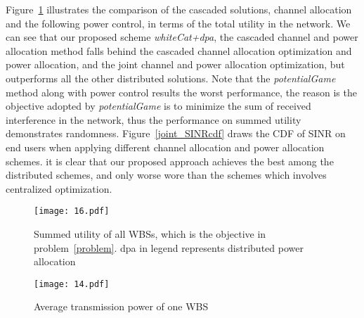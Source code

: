 Figure~\ref{CAPA_utility} illustrates the comparison of the cascaded solutions, \ie channel allocation and the following power control, in terms of the total utility in the network.
We can see that our proposed scheme \textit{whiteCat+dpa}, the cascaded channel and power allocation method falls behind the cascaded channel allocation optimization and power allocation, and the joint channel and power allocation optimization, but outperforms all the other distributed solutions.
Note that the \textit{potentialGame} method along with power control results the worst performance, the reason is the objective adopted by \textit{potentialGame} is to minimize the sum of received interference in the network, thus the performance on summed utility demonstrates randomness.
Figure~\ref{joint_SINRcdf} draws the CDF of SINR on end users when applying different channel allocation and power allocation schemes.
it is clear that our proposed approach achieves the best among the distributed schemes, and only worse wore than the schemes which involves centralized optimization.



\begin{figure}[h!]
  \centering
  \texttt{[image: 16.pdf]}
  \caption{Summed utility of all WBSs, which is the objective in problem~\ref{problem}. dpa in legend represents distributed power allocation}
\label{CAPA_utility}
\end{figure}






\begin{figure}[h!]
  \centering
  \texttt{[image: 14.pdf]}
  \caption{Average transmission power of one WBS}
\label{CAPA_power}
\end{figure}
%
%



